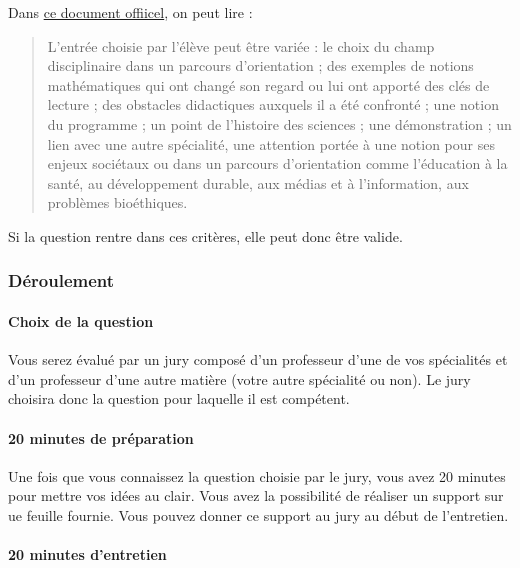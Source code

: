 \documentclass[
  a4paper,
  DIV=11,
  numbers=noendperiod]{scrartcl}
\let\oldparagraph\paragraph
\renewcommand{\paragraph}[1]{\oldparagraph{#1}\mbox{}}
\begin{document}
Dans \href{https://eduscol.education.fr/media/3925/download}{ce document
offiicel}, on peut lire :

\begin{quote}
L'entrée choisie par l'élève peut être variée : le choix du champ
disciplinaire dans un parcours d'orientation ; des exemples de notions
mathématiques qui ont changé son regard ou lui ont apporté des clés de
lecture ; des obstacles didactiques auxquels il a été confronté ; une
notion du programme ; un point de l'histoire des sciences ; une
démonstration ; un lien avec une autre spécialité, une attention portée
à une notion pour ses enjeux sociétaux ou dans un parcours d'orientation
comme l'éducation à la santé, au développement durable, aux médias et à
l'information, aux problèmes bioéthiques.
\end{quote}

Si la question rentre dans ces critères, elle peut donc être valide.

\hypertarget{duxe9roulement}{%
\subsubsection{Déroulement}\label{duxe9roulement}}

\hypertarget{choix-de-la-question}{%
\paragraph{Choix de la question}\label{choix-de-la-question}}

Vous serez évalué par un jury composé d'un professeur d'une de vos
spécialités et d'un professeur d'une autre matière (votre autre
spécialité ou non). Le jury choisira donc la question pour laquelle il
est compétent.

\hypertarget{minutes-de-pruxe9paration}{%
\paragraph{20 minutes de préparation}\label{minutes-de-pruxe9paration}}

Une fois que vous connaissez la question choisie par le jury, vous avez
20 minutes pour mettre vos idées au clair. Vous avez la possibilité de
réaliser un support sur ue feuille fournie. Vous pouvez donner ce
support au jury au début de l'entretien.

\hypertarget{minutes-dentretien}{%
\paragraph{20 minutes d'entretien}\label{minutes-dentretien}}
\end{document}
